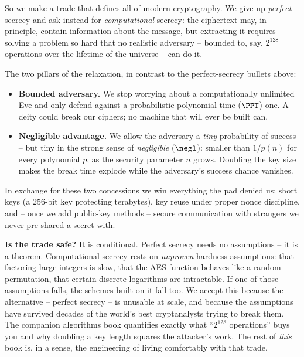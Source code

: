 So we make a trade that defines all of modern cryptography. We give up \emph{perfect} secrecy and ask instead for \emph{computational} secrecy: the ciphertext may, in principle, contain information about the message, but extracting it requires solving a problem so hard that no realistic adversary -- bounded to, say, $2^{128}$ operations over the lifetime of the universe -- can do it.

\begin{focusbox}
The two pillars of the relaxation, in contrast to the perfect-secrecy bullets above:
\begin{itemize}
  \item \textbf{Bounded adversary.} We stop worrying about a computationally unlimited Eve and only defend against a probabilistic polynomial-time ($\PPT$) one. A deity could break our ciphers; no machine that will ever be built can.
  \item \textbf{Negligible advantage.} We allow the adversary a \emph{tiny} probability of success -- but tiny in the strong sense of \emph{negligible} ($\negl$): smaller than $1/p(n)$ for every polynomial $p$, as the security parameter $n$ grows. Doubling the key size makes the break time explode while the adversary's success chance vanishes.
\end{itemize}
In exchange for these two concessions we win everything the pad denied us: short keys (a $256$-bit key protecting terabytes), key reuse under proper nonce discipline, and -- once we add public-key methods -- secure communication with strangers we never pre-shared a secret with.
\end{focusbox}

\begin{whybox}
\textbf{Is the trade safe?} It is conditional. Perfect secrecy needs no assumptions -- it is a theorem. Computational secrecy rests on \emph{unproven} hardness assumptions: that factoring large integers is slow, that the AES function behaves like a random permutation, that certain discrete logarithms are intractable. If one of those assumptions falls, the schemes built on it fall too. We accept this because the alternative -- perfect secrecy -- is unusable at scale, and because the assumptions have survived decades of the world's best cryptanalysts trying to break them. The companion algorithms book quantifies exactly what ``$2^{128}$ operations'' buys you and why doubling a key length squares the attacker's work. The rest of \emph{this} book is, in a sense, the engineering of living comfortably with that trade.
\end{whybox}

